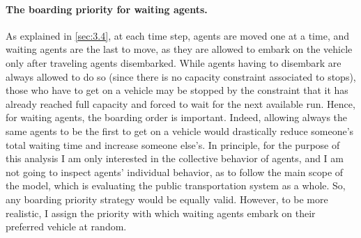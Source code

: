 \paragraph{The boarding priority for waiting agents.}
As explained in \ref{sec:3.4}, at each time step, agents are moved one at a time, and waiting agents are the last to move, as they are allowed to embark on the vehicle only after traveling agents disembarked. While agents having to disembark are always allowed to do so (since there is no capacity constraint associated to stops), those who have to get on a vehicle may be stopped by the constraint that it has already reached full capacity and forced to wait for the next available run. Hence, for waiting agents, the boarding order is important. Indeed, allowing always the same agents to be the first to get on a vehicle would drastically reduce someone's total waiting time and increase someone else's.
In principle, for the purpose of this analysis I am only interested in the collective behavior of agents, and I am not going to inspect agents' individual behavior, as to follow the main scope of the model, which is evaluating the public transportation system as a whole. So, any boarding priority strategy would be equally valid. However, to be more realistic, I assign the priority with which waiting agents embark on their preferred vehicle at random. 
